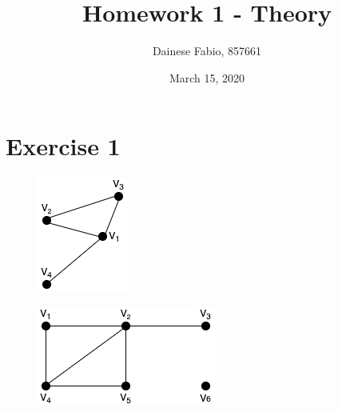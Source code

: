 \documentclass{article}
\title{Homework 1 - Theory}
\author{Dainese Fabio, 857661}
\date{March 15, 2020}
\begin{document}
\maketitle

\section{Exercise 1}
    \begin{figure}[H]
        \centering
        \begin{minipage}[b]{0.25\textwidth}
            \includegraphics[width=\textwidth]{1.png}
            \label{fig:figure-1-a}
        \end{minipage}
        \hfill
        \begin{minipage}[b]{0.5\textwidth}
            \includegraphics[width=\textwidth]{2.png}
            \label{fig:figure-1-b}
        \end{minipage}
        \label{fig:figure-1}
    \end{figure}
\end{document}
